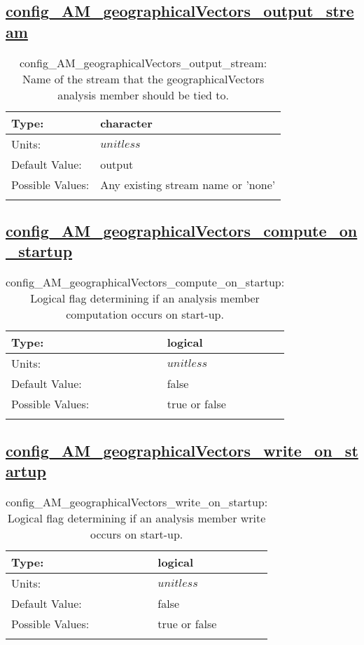 \subsection[config\_AM\_geographicalVectors\_output\_stream]{\hyperref[sec:nm_tab_AM_geographicalVectors]{config\_AM\_geographicalVectors\_output\_stream}}
\label{subsec:nm_sec_config_AM_geographicalVectors_output_stream}
\begin{center}
\begin{longtable}{| p{2.0in} || p{4.0in} |}
    \hline
    Type: & character \\
    \hline
    Units: & $unitless$ \\
    \hline
    Default Value: & output \\
    \hline
    Possible Values: & Any existing stream name or 'none' \\
    \hline
    \caption{config\_AM\_geographicalVectors\_output\_stream: Name of the stream that the geographicalVectors analysis member should be tied to.}
\end{longtable}
\end{center}
\subsection[config\_AM\_geographicalVectors\_compute\_on\_startup]{\hyperref[sec:nm_tab_AM_geographicalVectors]{config\_AM\_geographicalVectors\_compute\_on\_startup}}
\label{subsec:nm_sec_config_AM_geographicalVectors_compute_on_startup}
\begin{center}
\begin{longtable}{| p{2.0in} || p{4.0in} |}
    \hline
    Type: & logical \\
    \hline
    Units: & $unitless$ \\
    \hline
    Default Value: & false \\
    \hline
    Possible Values: & true or false \\
    \hline
    \caption{config\_AM\_geographicalVectors\_compute\_on\_startup: Logical flag determining if an analysis member computation occurs on start-up.}
\end{longtable}
\end{center}
\subsection[config\_AM\_geographicalVectors\_write\_on\_startup]{\hyperref[sec:nm_tab_AM_geographicalVectors]{config\_AM\_geographicalVectors\_write\_on\_startup}}
\label{subsec:nm_sec_config_AM_geographicalVectors_write_on_startup}
\begin{center}
\begin{longtable}{| p{2.0in} || p{4.0in} |}
    \hline
    Type: & logical \\
    \hline
    Units: & $unitless$ \\
    \hline
    Default Value: & false \\
    \hline
    Possible Values: & true or false \\
    \hline
    \caption{config\_AM\_geographicalVectors\_write\_on\_startup: Logical flag determining if an analysis member write occurs on start-up.}
\end{longtable}
\end{center}
